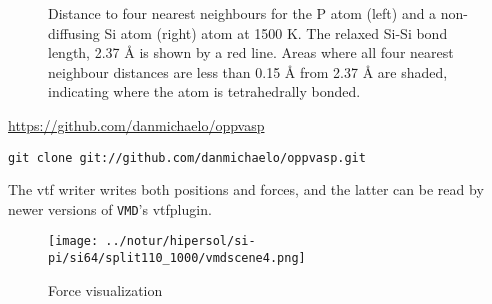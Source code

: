 \documentclass[11pt,bibliography=totoc,index=totoc]{scrbook}   %
\newcommand{\vmd}{{\texttt{VMD}}} %
\begin{document}
\begin{figure}[htbp]
  \centering
  \caption{Distance to four nearest neighbours for the P atom (left) and a non-diffusing 
      Si atom (right) atom at 1500 K. 
      The relaxed Si-Si bond length, 2.37 Å is shown by a red line. 
      Areas where all four nearest neighbour distances are less than 0.15 Å 
  from 2.37 Å are shaded, indicating where the atom is tetrahedrally bonded.}
  \label{fig:nneighboursex}
\end{figure}



\url{https://github.com/danmichaelo/oppvasp}
\begin{lstlisting}
git clone git://github.com/danmichaelo/oppvasp.git
\end{lstlisting}

The vtf writer writes both positions and forces, and the latter can be read by newer versions of {\vmd}'s vtfplugin.

\begin{figure}[htbp]
  \centering
  \texttt{[image: ../notur/hipersol/si-pi/si64/split110\_1000/vmdscene4.png]}
  \caption{Force visualization}
  \label{fig:forceviz}
\end{figure}



\end{document}

